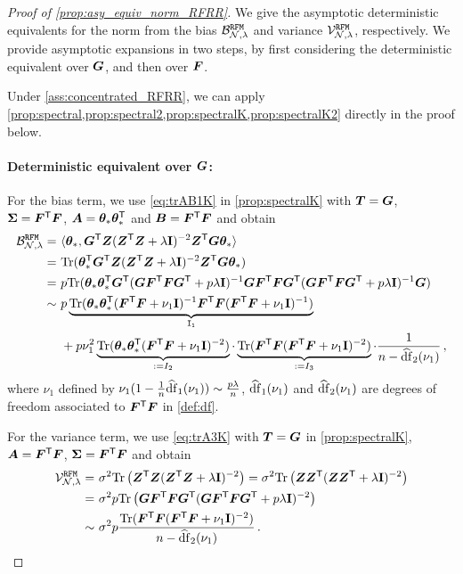\begin{proof}[Proof of \cref{prop:asy_equiv_norm_RFRR}]
We give the asymptotic deterministic equivalents for the norm from the bias $\mathcal{B}_{\mathcal{N},\lambda}^{\tt RFM}$ and variance $\mathcal{V}_{\mathcal{N},\lambda}^{\tt RFM}$, respectively. We provide asymptotic expansions in two steps, by first considering the deterministic equivalent over $\bG$, and then over $\bF$.

Under \cref{ass:concentrated_RFRR}, we can apply \cref{prop:spectral,prop:spectral2,prop:spectralK,prop:spectralK2} directly in the proof below.

\paragraph{Deterministic equivalent over $\bG$:}
For the bias term, we use \cref{eq:trAB1K} in \cref{prop:spectralK} with $\bT=\bG$, $\bSigma=\bF^\sT\bF$, $\bA=\btheta_*\btheta_*^\sT$ and $\bB=\bF^\sT\bF$ and obtain
\begin{equation}\label{eq:bnrfm}
   \begin{split}
          \mathcal{B}_{\mathcal{N},\lambda}^{\tt RFM} =&~ \<\btheta_*, \bG^\sT \bZ (\bZ^\sT \bZ + \lambda\id)^{-2} \bZ^\sT \bG\btheta_* \>\\
    =&~ \Tr(\btheta_*^\sT \bG^\sT \bZ (\bZ^\sT \bZ + \lambda\id)^{-2} \bZ^\sT \bG\btheta_* )\\
    =&~ p\Tr(\btheta_* \btheta_*^\sT \bG^\sT ( \bG \bF^\sT \bF \bG^\sT + p\lambda\id)^{-1} \bG \bF^\sT \bF \bG^\sT ( \bG \bF^\sT \bF \bG^\sT + p\lambda\id)^{-1} \bG )\\
    \sim&~ p \underbrace{\Tr(\btheta_* \btheta_*^\sT ( \bF^\sT \bF + \nu_1\id)^{-1} \bF^\sT \bF ( \bF^\sT \bF + \nu_1\id)^{-1} )}_{\tt I_1} \\
    &~ + p\nu_1^2 \underbrace{\Tr(\btheta_* \btheta_*^\sT ( \bF^\sT \bF + \nu_1\id)^{-2})}_{:=I_2} \cdot \underbrace{\Tr(\bF^\sT \bF ( \bF^\sT \bF + \nu_1\id)^{-2})}_{:=I_3} \cdot \frac{1}{n-\widehat{\rm df}_2(\nu_1)} \,,
   \end{split} 
\end{equation}
where $\nu_1$ defined by $\nu_1(1-\frac{1}{n}\widehat{\rm df}_1(\nu_1)) \sim \frac{p\lambda}{n}$, $\widehat{\rm df}_1(\nu_1)$ and $\widehat{\rm df}_2(\nu_1)$ are degrees of freedom associated to $\bF^\sT \bF$ in \cref{def:df}.

For the variance term, we use \cref{eq:trA3K} with $\bT=\bG$ in \cref{prop:spectralK}, $\bA=\bF^\sT\bF$, $\bSigma=\bF^\sT\bF$ and obtain
\[
\begin{aligned}
    \mathcal{V}_{\mathcal{N},\lambda}^{\tt RFM} =&~ \sigma^2\Tr\left(\bZ^\sT \bZ(\bZ^\sT \bZ + \lambda\id)^{-2}\right) = \sigma^2\Tr\left(\bZ \bZ^\sT(\bZ \bZ^\sT + \lambda\id)^{-2}\right)\\    =&~\sigma^2p\Tr\left(\bG\bF^\sT\bF\bG^\sT(\bG\bF^\sT\bF\bG^\sT + p\lambda\id)^{-2}\right)\\
    \sim&~\sigma^2p\frac{\Tr(\bF^\sT\bF(\bF^\sT\bF+\nu_1\id)^{-2})}{n-\widehat{\rm df}_2(\nu_1)}\,.
\end{aligned}
\]


\end{proof}
